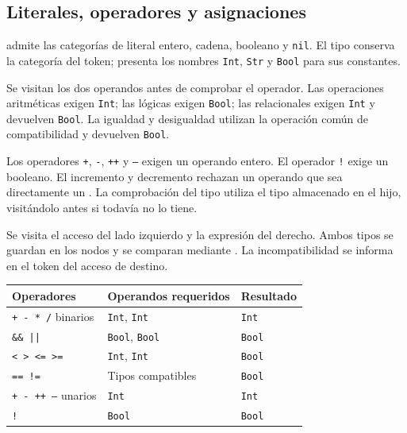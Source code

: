 \subsection{Literales, operadores y asignaciones}
\begin{description}[style=nextline]
  \item[Literal]
   admite las categorías de literal entero,
  cadena, booleano y \texttt{nil}. El tipo conserva la categoría del
  token;  presenta los nombres
  \texttt{Int}, \texttt{Str} y \texttt{Bool} para sus constantes.
  \item[Operación binaria]
  Se visitan los dos operandos antes de comprobar el operador.
  Las operaciones aritméticas exigen \texttt{Int}; las lógicas exigen
  \texttt{Bool}; las relacionales exigen \texttt{Int} y devuelven
  \texttt{Bool}. La igualdad y desigualdad utilizan la operación común
  de compatibilidad y devuelven \texttt{Bool}.
  \item[Operación unaria]
  Los operadores \texttt{+}, \texttt{-}, \texttt{++} y \texttt{--}
  exigen un operando entero. El operador \texttt{!} exige un booleano.
  El incremento y decremento rechazan un operando que sea directamente
  un . La comprobación del tipo utiliza el tipo
  almacenado en el hijo, visitándolo antes si todavía no lo tiene.
  \item[Asignación]
  Se visita el acceso del lado izquierdo y la expresión del derecho.
  Ambos tipos se guardan en los nodos y se comparan mediante
  . La incompatibilidad se informa en el
  token del acceso de destino.
\end{description}

\begin{center}
\small
\begin{tabular}{|l|l|l|}
\hline
\textbf{Operadores} & \textbf{Operandos requeridos} & \textbf{Resultado} \\ \hline
\texttt{+ - * /} binarios & \texttt{Int}, \texttt{Int} & \texttt{Int} \\ \hline
\texttt{\&\& ||} & \texttt{Bool}, \texttt{Bool} & \texttt{Bool} \\ \hline
\texttt{< > <= >=} & \texttt{Int}, \texttt{Int} & \texttt{Bool} \\ \hline
\texttt{== !=} & Tipos compatibles & \texttt{Bool} \\ \hline
\texttt{+ - ++ --} unarios & \texttt{Int} & \texttt{Int} \\ \hline
\texttt{!} & \texttt{Bool} & \texttt{Bool} \\ \hline
\end{tabular}
\end{center}

